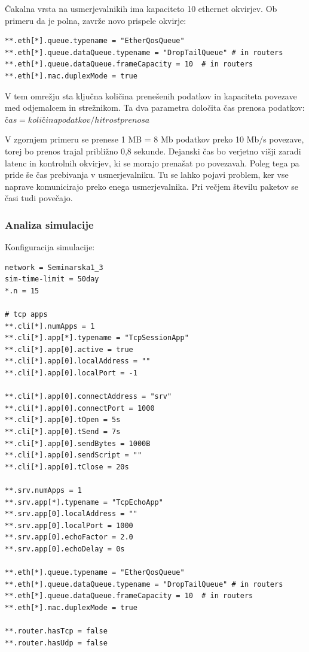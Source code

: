 \documentclass[11pt,a4paper,slovene]{myarticle}
\begin{document}
Čakalna vrsta na usmerjevalnikih ima kapaciteto 10 ethernet okvirjev. Ob primeru da je polna, zavrže novo prispele okvirje:
\begin{lstlisting}
**.eth[*].queue.typename = "EtherQosQueue"
**.eth[*].queue.dataQueue.typename = "DropTailQueue" # in routers
**.eth[*].queue.dataQueue.frameCapacity = 10  # in routers
**.eth[*].mac.duplexMode = true
\end{lstlisting}

V tem omrežju sta ključna količina prenešenih podatkov in kapaciteta povezave med odjemalcem in strežnikom. Ta dva parametra določita čas prenosa podatkov:
$čas = količina podatkov / hitrost prenosa$

V zgornjem primeru se prenese 1 MB = 8 Mb podatkov preko 10 Mb/s povezave, torej bo prenos trajal približno 0,8 sekunde. Dejanski čas bo verjetno višji zaradi latenc in kontrolnih okvirjev, ki se morajo prenašat po povezavah.
Poleg tega pa pride še čas prebivanja v usmerjevalniku. Tu se lahko pojavi problem, ker vse naprave komunicirajo preko enega usmerjevalnika.
Pri večjem številu paketov se časi tudi povečajo.


\subsubsection{Analiza simulacije}

Konfiguracija simulacije:

\begin{lstlisting}
network = Seminarska1_3
sim-time-limit = 50day
*.n = 15

# tcp apps
**.cli[*].numApps = 1
**.cli[*].app[*].typename = "TcpSessionApp"
**.cli[*].app[0].active = true
**.cli[*].app[0].localAddress = ""
**.cli[*].app[0].localPort = -1

**.cli[*].app[0].connectAddress = "srv"
**.cli[*].app[0].connectPort = 1000
**.cli[*].app[0].tOpen = 5s
**.cli[*].app[0].tSend = 7s
**.cli[*].app[0].sendBytes = 1000B
**.cli[*].app[0].sendScript = ""
**.cli[*].app[0].tClose = 20s

**.srv.numApps = 1
**.srv.app[*].typename = "TcpEchoApp"
**.srv.app[0].localAddress = ""
**.srv.app[0].localPort = 1000
**.srv.app[0].echoFactor = 2.0
**.srv.app[0].echoDelay = 0s

**.eth[*].queue.typename = "EtherQosQueue"
**.eth[*].queue.dataQueue.typename = "DropTailQueue" # in routers
**.eth[*].queue.dataQueue.frameCapacity = 10  # in routers
**.eth[*].mac.duplexMode = true

**.router.hasTcp = false
**.router.hasUdp = false

\end{lstlisting}
\end{document}
